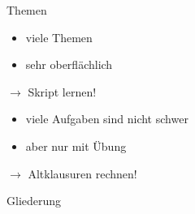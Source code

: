\documentclass[18pt]{beamer}
\makeatletter
\newcommand*{\currentname}{\@currentlabelname}
\makeatother
\begin{document}
\begin{frame}{Themen}
  \begin{itemize}
    \item viele Themen
    \item sehr oberflächlich
  \end{itemize}
  $\rightarrow$ Skript lernen!
  \pause
  \begin{itemize}
    \item viele Aufgaben sind nicht schwer
    \item aber nur mit Übung
  \end{itemize}
  $\rightarrow$ Altklausuren rechnen!
\end{frame}

\begin{frame}{Gliederung}
  \tableofcontents
\end{frame}

\AtBeginSection[]
{
  \begin{frame}
    \begin{center}
      \huge \currentname
    \end{center}
  \end{frame}
}






\end{document}
